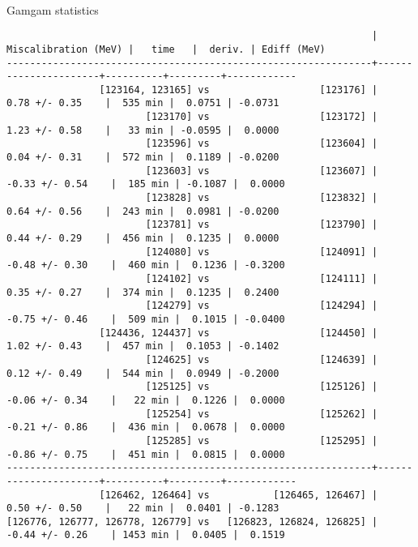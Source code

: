 \documentclass[landscape]{article}
\newenvironment{slide}{\mbox{ }\vfill}{\vfill \mbox{ } \pagebreak}
\begin{document}
\renewcommand{\labelitemi}{-}
\setlength{\parindent}{0 cm}

\begin{slide}
\begin{center}
\huge Gamgam statistics
\end{center}

\begin{verbatim}
                                                               | Miscalibration (MeV) |   time   |  deriv. | Ediff (MeV)
---------------------------------------------------------------+----------------------+----------+---------+------------
                [123164, 123165] vs                   [123176] |     0.78 +/- 0.35    |  535 min |  0.0751 | -0.0731
                        [123170] vs                   [123172] |     1.23 +/- 0.58    |   33 min | -0.0595 |  0.0000
                        [123596] vs                   [123604] |     0.04 +/- 0.31    |  572 min |  0.1189 | -0.0200
                        [123603] vs                   [123607] |    -0.33 +/- 0.54    |  185 min | -0.1087 |  0.0000
                        [123828] vs                   [123832] |     0.64 +/- 0.56    |  243 min |  0.0981 | -0.0200
                        [123781] vs                   [123790] |     0.44 +/- 0.29    |  456 min |  0.1235 |  0.0000
                        [124080] vs                   [124091] |    -0.48 +/- 0.30    |  460 min |  0.1236 | -0.3200
                        [124102] vs                   [124111] |     0.35 +/- 0.27    |  374 min |  0.1235 |  0.2400
                        [124279] vs                   [124294] |    -0.75 +/- 0.46    |  509 min |  0.1015 | -0.0400
                [124436, 124437] vs                   [124450] |     1.02 +/- 0.43    |  457 min |  0.1053 | -0.1402
                        [124625] vs                   [124639] |     0.12 +/- 0.49    |  544 min |  0.0949 | -0.2000
                        [125125] vs                   [125126] |    -0.06 +/- 0.34    |   22 min |  0.1226 |  0.0000
                        [125254] vs                   [125262] |    -0.21 +/- 0.86    |  436 min |  0.0678 |  0.0000
                        [125285] vs                   [125295] |    -0.86 +/- 0.75    |  451 min |  0.0815 |  0.0000
---------------------------------------------------------------+----------------------+----------+---------+------------
                [126462, 126464] vs           [126465, 126467] |     0.50 +/- 0.50    |   22 min |  0.0401 | -0.1283
[126776, 126777, 126778, 126779] vs   [126823, 126824, 126825] |    -0.44 +/- 0.26    | 1453 min |  0.0405 |  0.1519

\end{verbatim}
\end{slide}
\end{document}

